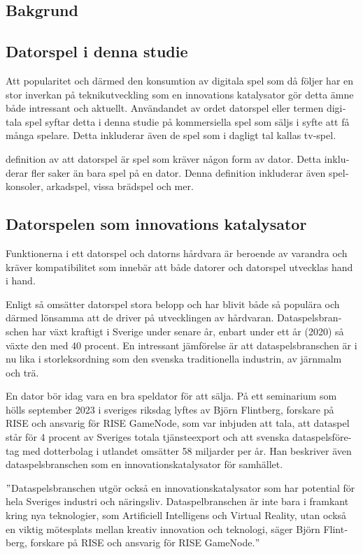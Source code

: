 \documentclass[11p]{article}
\begin{document}
\begin{otherlanguage}{swedish}
        \section{Bakgrund} %

    \subsection{ Datorspel i denna studie}
    Att popularitet och därmed den konsumtion av digitala spel som då följer har en stor inverkan på teknikutveckling som en innovations katalysator gör detta ämne både intressant och aktuellt.
    Användandet av ordet datorspel eller termen digitala spel syftar detta i denna studie på kommersiella spel som säljs i syfte att få många spelare.
    Detta inkluderar även de spel som i dagligt tal kallas tv-spel.

    \textcite{ComputerSweden} definition av att datorspel är spel som kräver någon form av dator.
    Detta inkluderar fler saker än bara spel på en dator.
    Denna definition inkluderar även spelkonsoler, arkadspel, vissa brädspel och mer.

        \subsection{Datorspelen som innovations katalysator}
    Funktionerna i ett datorspel och datorns hårdvara är beroende av varandra och kräver kompatibilitet som innebär att både datorer och datorspel utvecklas hand i hand.


    Enligt \textcite{Riksdag} så omsätter datorspel stora belopp och har blivit både så populära och därmed lönsamma att de driver på utvecklingen av hårdvaran.
    Dataspelsbranschen har växt kraftigt i Sverige under senare år, enbart under ett år (2020) så växte den med 40 procent.
    En intressant jämförelse är att dataspelsbranschen är i nu lika i
    storleksordning som den svenska traditionella industrin, av järnmalm och trä.

    En dator bör idag vara en bra speldator för att sälja.
    På ett seminarium som hölls september 2023 i sveriges riksdag lyftes av  Björn Flintberg, forskare på RISE och ansvarig för RISE GameNode, som var inbjuden att tala, att dataspel står för 4 procent av Sveriges totala tjänsteexport och att svenska dataspelsföretag med dotterbolag i utlandet omsätter 58 miljarder per år.
    Han beskriver även dataspelsbranschen som en innovationskatalysator för samhället.

    \setlength{\leftskip}{1cm}
        \("\)Dataspelsbranschen utgör också en innovationskatalysator som har potential för hela Sveriges industri och näringsliv.
        Dataspelbranschen är inte bara i framkant kring nya teknologier, som Artificiell Intelligens och Virtual Reality, utan också en viktig mötesplats mellan kreativ innovation och teknologi, säger Björn Flintberg, forskare på RISE och ansvarig för RISE GameNode.\("\)\parencite{growth}



\end{otherlanguage}
\end{document}
